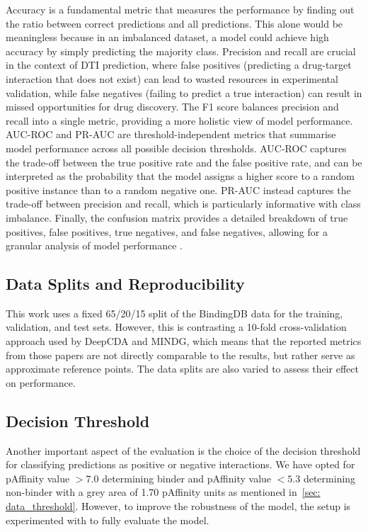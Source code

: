 Accuracy is a fundamental metric that measures the performance by finding out the ratio between correct predictions and all predictions.
This alone would be meaningless because in an imbalanced dataset, a model could achieve high accuracy by simply predicting the majority class.
Precision and recall are crucial in the context of DTI prediction, where false positives (predicting a drug-target interaction that does not exist) can lead to wasted resources in experimental validation, while false negatives (failing to predict a true interaction) can result in missed opportunities for drug discovery.
The F1 score balances precision and recall into a single metric, providing a more holistic view of model performance.
AUC-ROC and PR-AUC are threshold-independent metrics that summarise model performance across all possible decision thresholds.
AUC-ROC captures the trade-off between the true positive rate and the false positive rate, and can be interpreted as the probability that the model assigns a higher score to a random positive instance than to a random negative one.
PR-AUC instead captures the trade-off between precision and recall, which is particularly informative with class imbalance.
Finally, the confusion matrix provides a detailed breakdown of true positives, false positives, true negatives, and false negatives, allowing for a granular analysis of model performance \citep{geeksforgeeks_metrics_2025}.

    \subsection{Data Splits and Reproducibility}
    \label{sec: eval_splits}
This work uses a fixed 65/20/15 split of the BindingDB data for the training, validation, and test sets.
However, this is contrasting a 10-fold cross-validation approach used by DeepCDA and MINDG, which means that the reported metrics from those papers are not directly comparable to the results, but rather serve as approximate reference points.
The data splits are also varied to assess their effect on performance.
    \subsection{Decision Threshold}
    \label{sec: eval_threshold}
Another important aspect of the evaluation is the choice of the decision threshold for classifying predictions as positive or negative interactions.
We have opted for pAffinity value $> 7.0$ determining binder and pAffinity value $< 5.3$ determining non-binder with a grey area of 1.70 pAffinity units as mentioned in~\ref{sec: data_threshold}.
However, to improve the robustness of the model, the setup is experimented with to fully evaluate the model.

